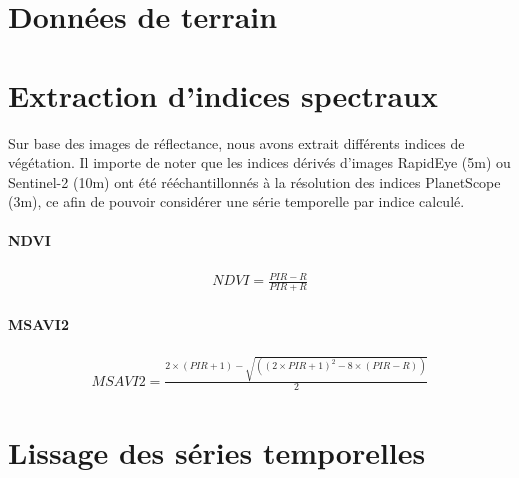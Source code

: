 \section{Données de terrain}
  
\section{Extraction d'indices spectraux}

Sur base des images de réflectance, nous avons extrait différents indices de végétation. Il importe de noter que les indices dérivés d'images RapidEye (5m) ou Sentinel-2 (10m) 
ont été rééchantillonnés à la résolution des indices PlanetScope (3m), ce afin de pouvoir considérer une série temporelle par indice calculé. 

\paragraph{NDVI} \citep{Rouse1974,Tucker1979} 

\begin{align}
 NDVI = \frac{PIR - R}{PIR + R}
\end{align}

\paragraph{MSAVI2} \citep{Qi1994}

\begin{align}
 MSAVI2 = \frac{2 \times (PIR + 1) - \sqrt{((2 \times PIR + 1)^2 - 8 \times (PIR - R))}}{2}
\end{align}

\section{Lissage des séries temporelles}


